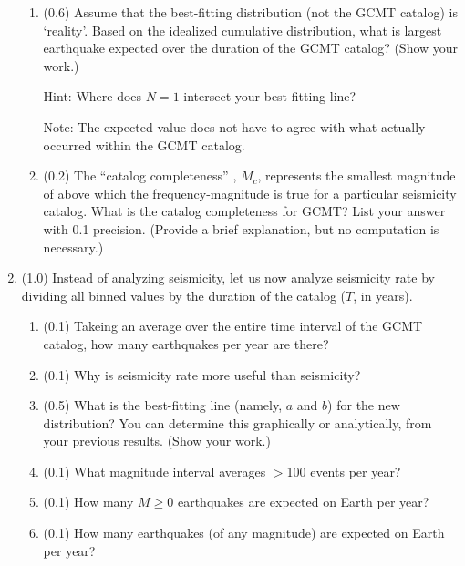 \documentclass[11pt,titlepage,fleqn]{article}
\begin{document}
\begin{enumerate}
\begin{enumerate}

\item (0.6) Assume that the best-fitting distribution (not the GCMT catalog) is `reality'. Based on the idealized cumulative distribution, what is largest earthquake expected over the duration of the GCMT catalog? (Show your work.)

Hint: Where does $N = 1$ intersect your best-fitting line?

Note: The expected value does not have to agree with what actually occurred within the GCMT catalog.


\item (0.2) The ``catalog completeness'' \citep[\eg][]{WiemerWyss2000}, $M_c$, represents the smallest magnitude of above which the frequency-magnitude is true for a particular seismicity catalog. What is the catalog completeness for GCMT? List your answer with 0.1 precision. (Provide a brief explanation, but no computation is necessary.)

\end{enumerate}


\item (1.0) Instead of analyzing seismicity, let us now analyze seismicity rate by dividing all binned values by the duration of the catalog ($T$, in years).
%
\begin{enumerate}
\item (0.1) Takeing an average over the entire time interval of the GCMT catalog, how many earthquakes per year are there?

\item (0.1) Why is seismicity rate more useful than seismicity?

\item (0.5) What is the best-fitting line (namely, $a$ and $b$) for the new distribution?
You can determine this graphically or analytically, from your previous results.
(Show your work.)

\item (0.1) What magnitude interval averages $>$100 events per year?

\item (0.1) How many $M \ge 0$ earthquakes are expected on Earth per year?

\item (0.1) How many earthquakes (of any magnitude) are expected on Earth per year?
\end{enumerate}


\end{enumerate}
\end{document}
